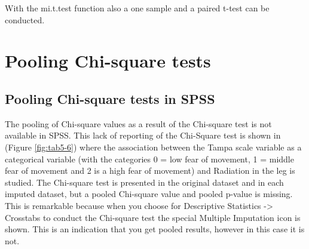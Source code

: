 \documentclass[]{book}
\begin{document}
With the mi.t.test function also a one sample and a paired t-test can be
conducted.

\section{Pooling Chi-square tests}\label{pooling-chi-square-tests}

\subsection{Pooling Chi-square tests in
SPSS}\label{pooling-chi-square-tests-in-spss}

The pooling of Chi-square values as a result of the Chi-square test is
not available in SPSS. This lack of reporting of the Chi-Square test is
shown in (Figure \ref{fig:tab5-6}) where the association between the
Tampa scale variable as a categorical variable (with the categories 0 =
low fear of movement, 1 = middle fear of movement and 2 is a high fear
of movement) and Radiation in the leg is studied. The Chi-square test is
presented in the original dataset and in each imputed dataset, but a
pooled Chi-square value and pooled p-value is missing. This is
remarkable because when you choose for Descriptive Statistics
-\textgreater{} Crosstabs to conduct the Chi-square test the special
Multiple Imputation icon is shown. This is an indication that you get
pooled results, however in this case it is not.
\end{document}
